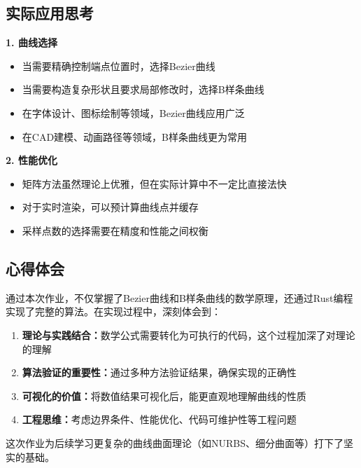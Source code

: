 \documentclass[12pt,a4paper]{article}
\begin{document}
\begin{tcolorbox}[breakable]
\subsection{实际应用思考}

\textbf{1. 曲线选择}

\begin{itemize}
\item 当需要精确控制端点位置时，选择Bezier曲线
\item 当需要构造复杂形状且要求局部修改时，选择B样条曲线
\item 在字体设计、图标绘制等领域，Bezier曲线应用广泛
\item 在CAD建模、动画路径等领域，B样条曲线更为常用
\end{itemize}

\textbf{2. 性能优化}

\begin{itemize}
\item 矩阵方法虽然理论上优雅，但在实际计算中不一定比直接法快
\item 对于实时渲染，可以预计算曲线点并缓存
\item 采样点数的选择需要在精度和性能之间权衡
\end{itemize}

\subsection{心得体会}

通过本次作业，不仅掌握了Bezier曲线和B样条曲线的数学原理，还通过Rust编程实现了完整的算法。在实现过程中，深刻体会到：

\begin{enumerate}
\item \textbf{理论与实践结合：}数学公式需要转化为可执行的代码，这个过程加深了对理论的理解
\item \textbf{算法验证的重要性：}通过多种方法验证结果，确保实现的正确性
\item \textbf{可视化的价值：}将数值结果可视化后，能更直观地理解曲线的性质
\item \textbf{工程思维：}考虑边界条件、性能优化、代码可维护性等工程问题
\end{enumerate}

这次作业为后续学习更复杂的曲线曲面理论（如NURBS、细分曲面等）打下了坚实的基础。
\end{tcolorbox}
\end{document}
